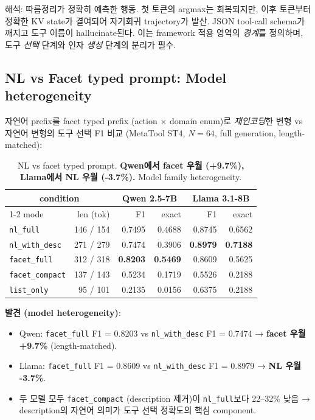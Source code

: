 \documentclass[11pt]{article}
\theoremstyle{definition}
\begin{document}
해석: 따름정리가 정확히 예측한 행동. 첫 토큰의 argmax는 회복되지만, 이후 토큰부터 정확한 KV state가 결여되어 자기회귀 trajectory가 발산. JSON tool-call schema가 깨지고 도구 이름이 hallucinate된다. 이는 framework 적용 영역의 \emph{경계}를 정의하며, 도구 \emph{선택} 단계와 인자 \emph{생성} 단계의 분리가 필수.

\subsection{NL vs Facet typed prompt: Model heterogeneity}
\label{sec:exp-facet-nl}

자연어 prefix를 facet typed prefix (action $\times$ domain enum)로 \emph{재인코딩}한 변형 vs 자연어 변형의 도구 선택 F1 비교 (MetaTool ST4, $N=64$, full generation, length-matched):

\begin{table}[h]
\centering
\caption{NL vs facet typed prompt. \textbf{Qwen에서 facet 우월 (+9.7\%), Llama에서 NL 우월 (-3.7\%).} Model family heterogeneity.}
\label{tab:facet-nl}
\small
\begin{tabular}{lrrrrr}
\toprule
\multicolumn{2}{c}{condition} & \multicolumn{2}{c}{Qwen 2.5-7B} & \multicolumn{2}{c}{Llama 3.1-8B} \\
\cmidrule{1-2} \cmidrule{3-4} \cmidrule{5-6}
mode & len (tok) & F1 & exact & F1 & exact \\
\midrule
\texttt{nl\_full}        & 146 / 154 & 0.7495 & 0.4688 & 0.8745 & 0.6562 \\
\texttt{nl\_with\_desc}  & 271 / 279 & 0.7474 & 0.3906 & \textbf{0.8979} & \textbf{0.7188} \\
\texttt{facet\_full}     & 312 / 318 & \textbf{0.8203} & \textbf{0.5469} & 0.8609 & 0.5625 \\
\texttt{facet\_compact}  & 137 / 143 & 0.5234 & 0.1719 & 0.5526 & 0.2188 \\
\texttt{list\_only}      &  95 / 101 & 0.2135 & 0.0156 & 0.6375 & 0.2188 \\
\bottomrule
\end{tabular}
\end{table}

\textbf{발견 (model heterogeneity)}:
\begin{itemize}[leftmargin=*]
\item Qwen: \texttt{facet\_full} F1 = 0.8203 vs \texttt{nl\_with\_desc} F1 = 0.7474 → \textbf{facet 우월 +9.7\%} (length-matched).
\item Llama: \texttt{facet\_full} F1 = 0.8609 vs \texttt{nl\_with\_desc} F1 = 0.8979 → \textbf{NL 우월 -3.7\%}.
\item 두 모델 모두 \texttt{facet\_compact} (description 제거)이 \texttt{nl\_full}보다 22--32\% 낮음 → description의 자연어 의미가 도구 선택 정확도의 핵심 component.
\end{itemize}
\end{document}

